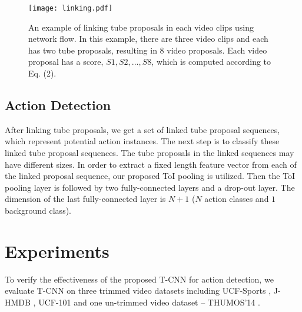 \documentclass[10pt,twocolumn,letterpaper]{article}
\begin{document}
\begin{figure}[h]
\centering
\texttt{[image: linking.pdf]}
\caption{An example of linking tube proposals in each video clips using network flow. In this example, there are three video clips and each has two tube proposals, resulting in 8 video proposals. Each video proposal has a score, \eg $S1, S2, ..., S8$, which is computed according to Eq. (2).}
\label{fig:link}
\end{figure}


\subsection{Action Detection}
\label{subsec: recognition}
After linking tube proposals, we get a set of linked tube proposal sequences, which represent potential action instances. The next step is to classify these linked tube proposal sequences. The tube proposals in the linked sequences may have different sizes. In order to extract a fixed length feature vector from each of the linked proposal sequence, our proposed ToI pooling is utilized. Then the ToI pooling layer is followed by two fully-connected layers and a drop-out layer. The dimension of the last fully-connected layer is $N+1$ ($N$ action classes and $1$ background class). 











\section{Experiments}
\label{sec:experiments}

To verify the effectiveness of the proposed T-CNN for action detection,
we evaluate T-CNN on three trimmed video datasets including UCF-Sports \cite{rodriguez2008action},
J-HMDB \cite{Jhuang:ICCV:2013}, UCF-101 \cite{THUMOS13} and one un-trimmed video dataset -- THUMOS'14 \cite{THUMOS14}.
\end{document}
